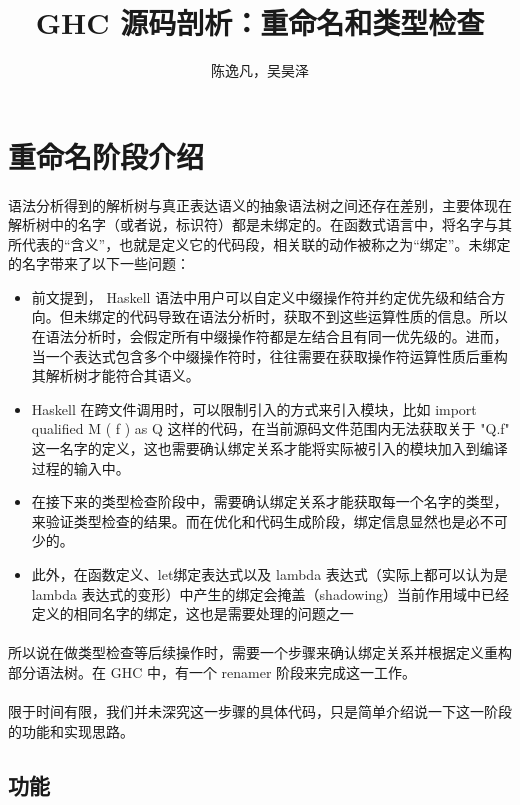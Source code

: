 \documentclass{article}
\author{陈逸凡，吴昊泽}
\title{GHC 源码剖析：重命名和类型检查}
\begin{document}
	\maketitle
	\section{重命名阶段介绍}
	\paragraph{}
	语法分析得到的解析树与真正表达语义的抽象语法树之间还存在差别，主要体现在解析树中的名字（或者说，标识符）都是未绑定的。在函数式语言中，将名字与其所代表的“含义”，也就是定义它的代码段，相关联的动作被称之为“绑定”。未绑定的名字带来了以下一些问题：
	\begin{itemize}
		\item 前文提到， Haskell 语法中用户可以自定义中缀操作符并约定优先级和结合方向。但未绑定的代码导致在语法分析时，获取不到这些运算性质的信息。所以在语法分析时，会假定所有中缀操作符都是左结合且有同一优先级的。进而，当一个表达式包含多个中缀操作符时，往往需要在获取操作符运算性质后重构其解析树才能符合其语义。
		\item Haskell 在跨文件调用时，可以限制引入的方式来引入模块，比如 import qualified M ( f ) as Q 这样的代码，在当前源码文件范围内无法获取关于 "Q.f" 这一名字的定义，这也需要确认绑定关系才能将实际被引入的模块加入到编译过程的输入中。
		\item 在接下来的类型检查阶段中，需要确认绑定关系才能获取每一个名字的类型，来验证类型检查的结果。而在优化和代码生成阶段，绑定信息显然也是必不可少的。
		\item 此外，在函数定义、let绑定表达式以及 lambda 表达式（实际上都可以认为是 lambda 表达式的变形）中产生的绑定会掩盖（shadowing）当前作用域中已经定义的相同名字的绑定，这也是需要处理的问题之一
	\end{itemize}
	\paragraph{}
	所以说在做类型检查等后续操作时，需要一个步骤来确认绑定关系并根据定义重构部分语法树。在 GHC 中，有一个 renamer 阶段来完成这一工作。
	\paragraph{}
	限于时间有限，我们并未深究这一步骤的具体代码，只是简单介绍说一下这一阶段的功能和实现思路。
	\subsection{功能}
\end{document}

